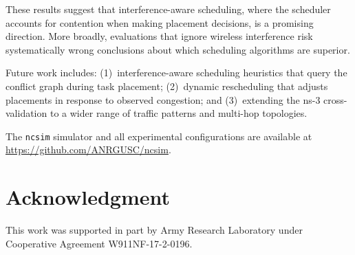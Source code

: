 \documentclass[conference]{IEEEtran}
\newcommand{\ncsim}{\texttt{ncsim}}
\begin{document}
These results suggest that interference-aware scheduling, where
the scheduler accounts for contention when making placement decisions,
is a promising direction.  More broadly, evaluations that ignore
wireless interference risk systematically wrong conclusions about which
scheduling algorithms are superior.

Future work includes: (1)~interference-aware scheduling heuristics that
query the conflict graph during task placement; (2)~dynamic rescheduling
that adjusts placements in response to observed congestion; and
(3)~extending the ns-3 cross-validation to a wider range of traffic
patterns and multi-hop topologies.

The \ncsim{} simulator and all experimental configurations are available
at \url{https://github.com/ANRGUSC/ncsim}.


\section*{Acknowledgment}
This work was supported in part by Army Research Laboratory under Cooperative Agreement W911NF-17-2-0196.
\end{document}
